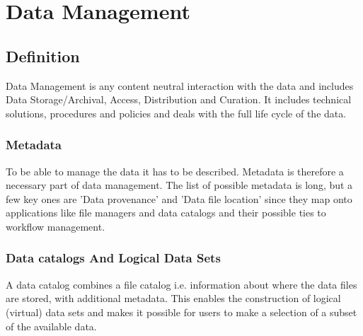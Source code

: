 \section{Data Management}
\label{data}


\subsection{Definition}
Data Management is any content neutral interaction with the data and includes Data Storage/Archival, Access, 
Distribution and Curation. It includes technical solutions, procedures and policies and deals with the full life 
cycle of the data. 



\subsubsection{Metadata}
To be able to manage the data it has to be described. Metadata is therefore a necessary part of data management. The 
list of possible metadata is long, but a few key ones are 'Data provenance' and 'Data file location' since they map onto 
applications like file managers and data catalogs and their possible ties to workflow management.

\subsubsection{Data catalogs And Logical Data Sets}
A data catalog combines a file catalog i.e. information about where the data files are stored, with additional metadata.
This enables the construction of logical (virtual) data sets and makes it possible for users to make a selection of a 
subset of the available data.

